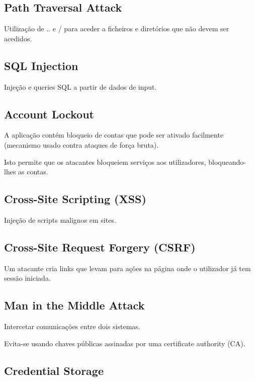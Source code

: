 \documentclass[../resumosLTW.tex]{subfiles}
\begin{document}
 

\subsection{Path Traversal Attack}

Utilização de .. e / para aceder a ficheiros e diretórios que não devem ser acedidos.

\subsection{SQL Injection}

Injeção e queries SQL a partir de dados de input.

\subsection{Account Lockout}

A aplicação contém bloqueio de contas que pode ser ativado facilmente (mecanismo usado contra ataques de força bruta).

Isto permite que os atacantes bloqueiem serviços aos utilizadores, bloqueando-lhes as contas.

\subsection{Cross-Site Scripting (XSS)}

Injeção de scripts malignos em sites.

\subsection{Cross-Site Request Forgery (CSRF)}

Um atacante cria links que levam para ações na página onde o utilizador já tem sessão iniciada.

\subsection{Man in the Middle Attack}

Intercetar comunicações entre dois sistemas.

Evita-se usando chaves públicas assinadas por uma certificate authority (CA).

\subsection{Credential Storage}
\end{document}
